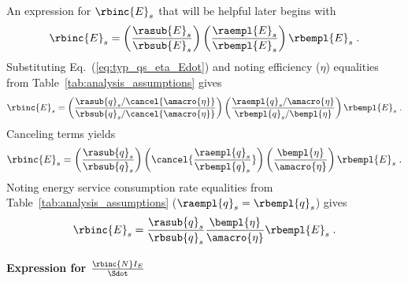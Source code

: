 An expression for $\rbinc{E}_s$ that will be helpful later
begins with
%
\begin{equation}
  \rbinc{E}_s = \left( \frac{\rasub{E}_s}{\rbsub{E}_s} \right)
                \left( \frac{\raempl{E}_s}{\rbempl{E}_s} \right)
                \rbempl{E}_s \; .
\end{equation}
%
Substituting Eq.~(\ref{eq:typ_qs_eta_Edot}) and noting efficiency ($\eta$)
equalities from Table~\ref{tab:analysis_assumptions} gives
%
\begin{equation}
  \rbinc{E}_s = \left( \frac{\rasub{q}_s / \cancel{\amacro{\eta}}}{\rbsub{q}_s / \cancel{\amacro{\eta}}} \right)
                \left( \frac{\raempl{q}_s / \amacro{\eta}}{\rbempl{q}_s / \bempl{\eta}} \right)
                \rbempl{E}_s \; .
\end{equation}
%
Canceling terms yields
%
\begin{equation}
  \rbinc{E}_s = \left( \frac{\rasub{q}_s}{\rbsub{q}_s} \right)
                \left( \cancel{\frac{\raempl{q}_s}{\rbempl{q}_s}} \right)
                \left( \frac{\bempl{\eta}}{\amacro{\eta}}  \right)
                \rbempl{E}_s \; .
\end{equation}
%
Noting energy service consumption rate equalities from Table~\ref{tab:analysis_assumptions} 
($\raempl{q}_s = \rbempl{q}_s$) gives
%
\begin{equation} \label{eq:E_dot_s_hat}
  \rbinc{E}_s = \frac{\rasub{q}_s}{\rbsub{q}_s}
                \frac{\bempl{\eta}}{\amacro{\eta}}
                \rbempl{E}_s \; .
\end{equation}

\paragraph{Expression for $\frac{\rbinc{N} I_E}{\Sdot}$}
\label{sec:N_dot_hat_I_E_over_Sdot}

